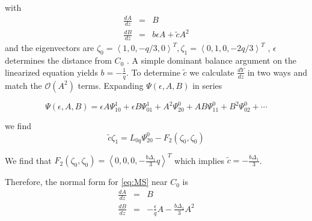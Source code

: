 with 
\begin{subequations}
\begin{eqnarray}
\frac{dA}{dz} &=& B \\
\frac{dB}{dz} &=& b \epsilon A + \tilde{c} A^2
\end{eqnarray}
\end{subequations}
and the eigenvectors are 
$\zeta_0 = \left<1,0,-q/3,0\right>^T, \zeta_1 = \left<0,1,0,-2 q/3\right>^T $ , $\epsilon$ determines the distance from $C_0$ .
A simple dominant balance argument on the linearized equation yields $b=-\frac{1}{q}$.
To determine $\tilde{c}$ we calculate $\frac{dY}{dz}$ in two ways and match the 
$\mathcal{O}(A^2)$ terms. Expanding $\Psi(\epsilon,A,B)$ in series 

\begin{equation}
\Psi(\epsilon,A,B) = \epsilon A \Psi_{10}^1 + \epsilon B \Psi_{01}^1 + A^2 \Psi_{20}^0 + A B \Psi_{11}^0 + B^2 \Psi_{02}^0 + \cdots
\end{equation}

we find \begin{equation} \tilde{c} \zeta_1 = L_{0q} \Psi_{20}^0 - F_2(\zeta_0,\zeta_0) \end{equation}

We find that $F_2(\zeta_0,\zeta_0) = \left<0,0,0,-\frac{ b \Delta_1 }{3} q \right>^T$ which implies $\tilde{c} = - \frac{b \Delta_1}{3} $.

Therefore, the normal form for \eqref{eq:MS} near $C_0$ is
\begin{subequations}
\begin{eqnarray}
\frac{dA}{dz} &=& B \\
\frac{dB}{dz} &=& -\frac{\epsilon}{q} A - \frac{ b \Delta_1}{3}  A^2
\end{eqnarray}
\end{subequations}
